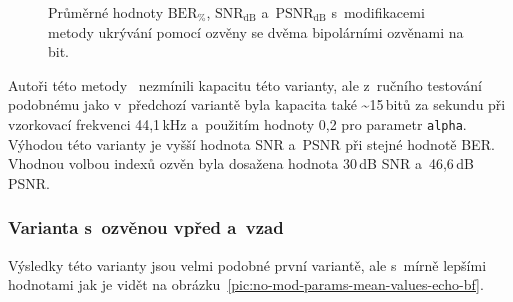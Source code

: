 \begin{figure}[H]
    \table
    \centering
    \caption{Průměrné hodnoty $\mathrm{BER}_{\%}$, $\mathrm{SNR}_\mathrm{dB}$
    a~$\mathrm{PSNR}_\mathrm{dB}$ s~modifikacemi metody ukrývání pomocí
    ozvěny se dvěma bipolárními ozvěnami na bit.}
    \label{pic:modifications-mean-values-echo-bipolar}
\end{figure}

Autoři této metody~\cite{Oh2001} nezmínili kapacitu této varianty, ale
z~ručního testování podobnému jako v~předchozí variantě byla kapacita také
\textasciitilde15\,bitů za sekundu při vzorkovací frekvenci 44,1\,kHz
a~použitím hodnoty 0,2 pro parametr \texttt{alpha}. Výhodou této varianty je
vyšší hodnota SNR a~PSNR při stejné hodnotě BER. Vhodnou volbou indexů ozvěn
byla dosažena hodnota 30\,dB SNR a~46,6\,dB PSNR.

\subsubsection*{Varianta s~ozvěnou vpřed a~vzad}

Výsledky této varianty jsou velmi podobné první variantě, ale s~mírně lepšími
hodnotami jak je vidět na obrázku~\ref{pic:no-mod-params-mean-values-echo-bf}.

